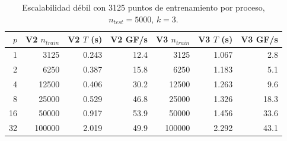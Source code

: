 \begin{table}[H]
\centering
\begin{tabular}{rrrrrrr}
\toprule
$p$ & V2 $n_{train}$ & V2 $T$ (s) & V2 GF/s & V3 $n_{train}$ & V3 $T$ (s) & V3 GF/s \\
\midrule
1 & 3125 & 0.243 & 12.4 & 3125 & 1.067 & 2.8 \\
2 & 6250 & 0.387 & 15.8 & 6250 & 1.183 & 5.1 \\
4 & 12500 & 0.406 & 30.2 & 12500 & 1.263 & 9.6 \\
8 & 25000 & 0.529 & 46.8 & 25000 & 1.326 & 18.3 \\
16 & 50000 & 0.917 & 53.9 & 50000 & 1.456 & 33.6 \\
32 & 100000 & 2.019 & 49.9 & 100000 & 2.292 & 43.1 \\
\bottomrule
\end{tabular}
\caption{Escalabilidad débil con 3125 puntos de entrenamiento por proceso, $n_{test}=5000$, $k=3$.}
\label{tab:weak}
\end{table}

